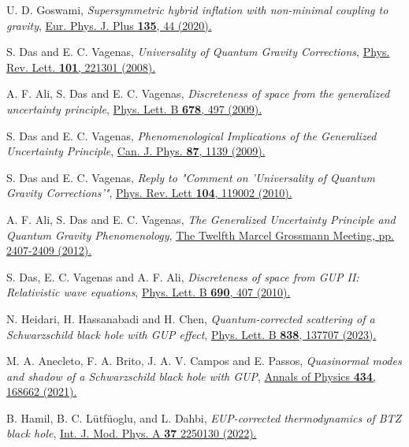 \documentclass[aps,amsmath,amssymb,showpacs,showkeys]{revtex4}
\begin{document}
\begin{thebibliography}{99}
U. D. Goswami, \textit{Supersymmetric hybrid inflation with non-minimal coupling to gravity}, \href{https://doi.org/10.1140/epjp/s13360-019-00005-2}{Eur. Phys. J. Plus \textbf{135}, 44 (2020).}

S. Das and E. C. Vagenas, \textit{Universality of Quantum Gravity Corrections}, \href{ 	
https://doi.org/10.1103/PhysRevLett.101.221301}{Phys. Rev. Lett. \textbf{101}, 221301 (2008).}

A. F. Ali, S. Das and E. C. Vagenas, \textit{Discreteness of space from the generalized uncertainty principle}, \href{https://doi.org/10.1016/j.physletb.2009.06.061}{Phys. Lett. B \textbf{678}, 497 (2009).}

S. Das and E. C. Vagenas, \textit{Phenomenological Implications of the Generalized Uncertainty Principle}, \href{ 	
https://doi.org/10.1139/P08-105}{Can. J. Phys. \textbf{87}, 1139 (2009).}

S. Das and E. C. Vagenas, \textit{Reply to "Comment on 'Universality of Quantum Gravity Corrections'"}, \href{https://doi.org/10.1103/PhysRevLett.104.119002}{Phys. Rev. Lett \textbf{104}, 119002 (2010).}

A. F. Ali, S. Das and E. C. Vagenas, \textit{The Generalized Uncertainty Principle and Quantum Gravity Phenomenology}, \href{ 	
https://doi.org/10.1142/9789814374552_0492}{The Twelfth Marcel Grossmann Meeting, pp. 2407-2409 (2012).}

S. Das, E. C. Vagenas and A. F. Ali, \textit{Discreteness of space from GUP II: Relativistic wave equations}, \href{https://doi.org/10.1016/j.physletb.2010.05.052}{Phys. Lett. B \textbf{690}, 407 (2010).}

N. Heidari, H. Hassanabadi and H. Chen, \textit{Quantum-corrected scattering of a Schwarzschild black hole with GUP effect}, \href{https://www.sciencedirect.com/science/article/pii/S0370269323000412?via%3Dihub}{Phys. Lett. B \textbf{838}, 137707 (2023).}

M. A. Anecleto, F. A. Brito, J. A. V. Campos and E. Passos, \textit{Quasinormal modes and shadow of a Schwarzschild black hole with GUP}, \href{https://www.sciencedirect.com/science/article/abs/pii/S0003491621002682}{Annals of Physics \textbf{434}, 168662 (2021).}

B. Hamil, B. C. L\"utf\"uoglu,  and L. Dahbi, \textit{EUP-corrected thermodynamics of BTZ black hole}, \href{https://www.worldscientific.com/doi/abs/10.1142/S0217751X22501305}{Int. J. Mod. Phys. A \textbf{37} 2250130 (2022).}


\end{thebibliography}
\end{document}
